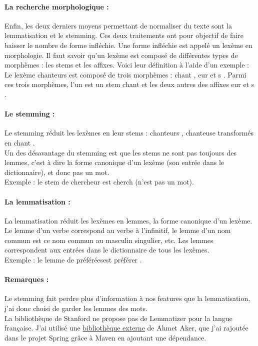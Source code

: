                 \paragraph{La recherche morphologique :}
                    Enfin, les deux derniers moyens permettant de normaliser du texte sont la lemmatisation et le stemming. Ces deux traitements ont pour objectif de faire baisser le nombre de forme infléchie. Une forme infléchie est appelé un lexème en morphologie. Il faut savoir qu'un lexème est composé de différentes types de morphèmes : les stems et les affixes. Voici leur définition à l'aide d'un exemple :\\
                    Le lexème \og chanteurs \fg est composé de trois morphèmes : \og chant \fg, \og eur \fg et \og s \fg. Parmi ces trois morphèmes, l'un est un stem \og chant \fg et les deux autres des affixes \og eur \fg et \og s \fg.


                \paragraph{Le stemming :}
                    Le stemming réduit les lexèmes en leur stems : \og chanteurs \fg, \og chanteuse \fg transformés en \og chant \fg.\\
                    Un des désavantage du stemming est que les stems ne sont pas toujours des lemmes, c'est à dire la forme canonique d'un lexème (son entrée dans le dictionnaire), et donc pas un mot.\\
                    Exemple : le stem de \og chercheur \fg est \og cherch \fg (n'est pas un mot).

                \paragraph{La lemmatisation :}
                    La lemmatisation réduit les lexèmes en lemmes, la forme canonique d'un lexème. Le lemme d'un verbe correspond au verbe à l'infinitif, le lemme d'un nom commun est ce nom commun au masculin singulier, etc. Les lemmes correspondent aux entrées dans le dictionnaire de tous les lexèmes.\\
                    Exemple : le lemme de \og préférées\fg est \og préférer \fg.

                \paragraph{Remarques :}
                    Le stemming fait perdre plus d'information à nos features que la lemmatisation, j'ai donc choisi de garder les lemmes des mots.\\
                    La bibliothèque de Stanford ne propose pas de Lemmatizer pour la langue française. J'ai utilisé une \href{http://staffwww.dcs.shef.ac.uk/people/A.Aker/activityNLPProjects.html}{bibliothèque externe} de Ahmet Aker, que j'ai rajoutée dans le projet Spring grâce à Maven en ajoutant une dépendance.

